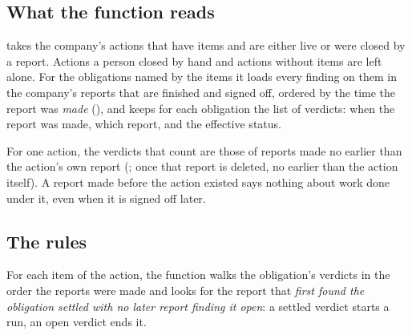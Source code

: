 \subsection{What the function reads}

 takes the company's actions that have items and are either live or were closed
by a report. Actions a person closed by hand and actions without items are left alone. For the
obligations named by the items it loads every finding on them in the company's reports that are
finished and signed off, ordered by the time the report was \emph{made} (),
and keeps for each obligation the list of verdicts: when the report was made, which report,
and the effective status.

For one action, the verdicts that count are those of reports made no earlier than the action's
own report (; once that report is deleted, no earlier than the action itself). A report made before the action existed says nothing about work
done under it, even when it is signed off later.

\subsection{The rules}

For each item of the action, the function walks the obligation's verdicts in the order the
reports were made and looks for the report that \emph{first found the obligation settled with
no later report finding it open}: a settled verdict starts a run, an open verdict ends it.

